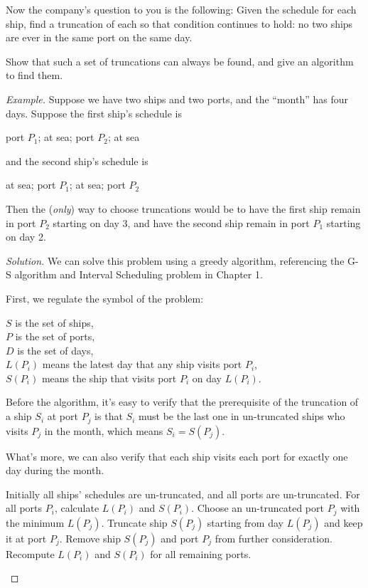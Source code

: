 \documentclass[12pt]{article}
\begin{document}
\begin{enumerate}[leftmargin=*]
Now the company's question to you is the following: Given the schedule for each ship, find a truncation of each so that condition continues to hold: no two ships are ever in the same port on the same day.

Show that such a set of truncations can always be found, and give an algorithm to find them.

\medskip

\noindent\textit{Example.} Suppose we have two ships and two ports, and the ``month'' has four days. Suppose the first ship's schedule is
\begin{center}
port $P_1$; at sea; port $P_2$; at sea
\end{center}
and the second ship's schedule is
\begin{center}
at sea; port $P_1$; at sea; port $P_2$
\end{center}
Then the (\textit{only}) way to choose truncations would be to have the first ship remain in port $P_2$ starting on day 3, and have the second ship remain in port $P_1$ starting on day 2.

\begin{proof}[Solution]
    We can solve this problem using a greedy algorithm, referencing the G-S algorithm and Interval Scheduling problem in Chapter 1.
    
    First, we regulate the symbol of the problem:
    \begin{center}
        $S$ is the set of ships, \\
        $P$ is the set of ports, \\
        $D$ is the set of days, \\
        $L(P_i)$ means the latest day that any ship visits port $P_i$, \\
        $S(P_i)$ means the ship that visits port $P_i$ on day $L(P_i)$.
    \end{center}
    
    Before the algorithm, it's easy to verify that the prerequisite of the truncation of a ship $S_i$ at port $P_j$ is that $S_i$ must be the last one in un-truncated ships who visits $P_j$ in the month, which means $S_i = S(P_j)$.

    What's more, we can also verify that each ship visits each port for exactly one day during the month.

    \begin{algorithm}
    \caption{Greedy Algorithm for Truncation}
    \begin{algorithmic}
    \STATE Initially all ships' schedules are un-truncated, and all ports are un-truncated.
    \STATE For all ports $P_i$, calculate $L(P_i)$ and $S(P_i)$.
        \STATE Choose an un-truncated port $P_j$ with the minimum $L(P_j)$.
        \STATE Truncate ship $S(P_j)$ starting from day $L(P_j)$ and keep it at port $P_j$.
        \STATE Remove ship $S(P_j)$ and port $P_j$ from further consideration.
        \STATE Recompute $L(P_i)$ and $S(P_i)$ for all remaining ports.
    \ENDWHILE
    \end{algorithmic}
    \end{algorithm}


\end{proof}
\end{enumerate}
\end{document}
